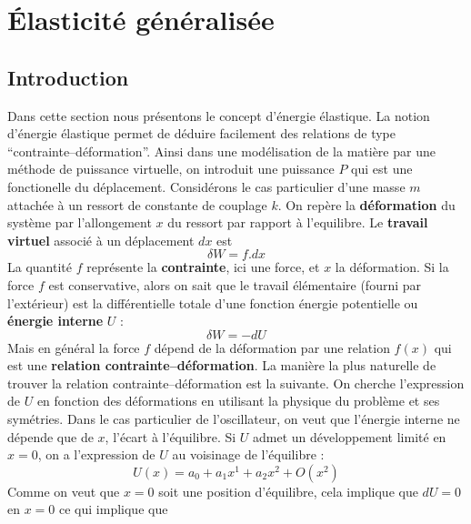 \documentclass[12pt]{book}
\begin{document}
\section{\'Elasticit\'e g\'en\'eralis\'ee}\label{secelastigene} 
\subsection{Introduction}
Dans cette section nous pr\'esentons le concept d'\'energie \'elastique.
La notion d'\'energie \'elastique permet de d\'eduire facilement des
relations de type ``contrainte--d\'eformation''. 
Ainsi dans une mod\'elisation de la mati\`ere par une m\'ethode de
puissance virtuelle, on introduit une
puissance $P$ qui est une 
fonctionelle du d\'eplacement. Consid\'erons le cas particulier d'une
masse $m$ attach\'ee \`a un ressort de constante de couplage $k$. On
rep\`ere la {\bf d\'eformation} du syst\`eme par l'allongement $x$ du
ressort par rapport \`a l'equilibre.
Le {\bf travail virtuel} associ\'e \`a un
d\'eplacement $dx$ est  
\begin{equation}\label{deltWfdx}
\delta W=f.dx
\end{equation}
La quantit\'e $f$ repr\'esente la {\bf contrainte}, ici une force, et
$x$ la d\'eformation. Si la force $f$ est conservative, alors on sait
que le travail \'el\'ementaire (fourni par l'ext\'erieur) est la
diff\'erentielle totale d'une 
fonction \'energie potentielle ou {\bf \'energie interne} $U$ :
\begin{equation}\label{eqdeltaWdU}
\delta W=-dU
\end{equation}
Mais en g\'en\'eral la force $f$ d\'epend de la d\'eformation par une
relation $f(x)$ qui est une {\bf relation contrainte--d\'eformation}.
La mani\`ere la plus naturelle de trouver la relation
contrainte--d\'eformation est la suivante. On cherche l'expression de
$U$ en fonction des d\'eformations en utilisant la physique du
probl\`eme et ses sym\'etries. Dans le cas particulier de
l'oscillateur, on veut que l'\'energie interne ne d\'epende que de $x$,
l'\'ecart \`a l'\'equilibre. 
Si $U$ admet un d\'eveloppement limit\'e en $x=0$, on a l'expression
de $U$ au voisinage de l'\'equilibre :
\begin{equation}
U(x)=a_0+a_1x^1+a_2x^2+O(x^2)
\end{equation}
Comme on veut que $x=0$ soit une position
d'\'equilibre, cela implique que $dU=0$ en $x=0$ ce qui implique que
\end{document}
